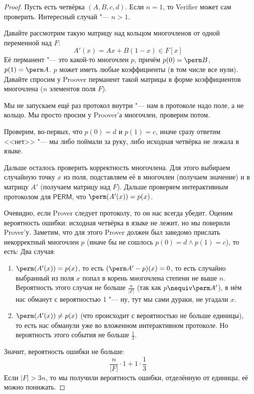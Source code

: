 	\begin{proof}
		Пусть есть четвёрка $(A, B, c, d)$.
		Если $n=1$, то Verifier может сам проверить.
		Интересный случай "--- $n>1$.

		Давайте рассмотрим такую матрицу над кольцом многочленов от одной переменной над $F$:
		\[ A'(x) = Ax + B(1-x) \in F[x] \]
		Её перманент "--- это какой-то многочлен $p$, причём $p(0)=\perm B$, $p(1)=\perm A$.
		$p$ может иметь любые коэффициенты (в том числе все нули).
		Давайте спросим у Proover перманент такой матрицы в форме коэффициентов многочлена ($n$ элементов поля $F$).
		\begin{Rem}
			Мы не запускаем ещё раз протокол внутри "--- нам в протоколе надо поле, а не кольцо.
			Мы просто просим у Proover'а многочлен, проверим потом.
		\end{Rem}
		Проверим, во-первых, что $p(0)=d$ и $p(1)=c$, иначе сразу ответим <<нет>> "--- мы либо поймали за руку, либо исходная четвёрка не лежала в языке.

		Дальше осталось проверить корректность многочлена.
		Для этого выбираем случайную точку $x$ из поля, подставляем её в многочлен (получаем значение) и в матрицу $A'$ (получаем матрицу над $F$).
		Дальше проверяем интерактивным протоколом для $\mathsf{PERM}$, что $\perm (A'(x)) = p(x)$.

		Очевидно, если Prover следует протоколу, то он нас всегда убедит.
		Оценим вероятность ошибки: исходная четвёрка в языке не лежит, но мы поверили Prover'у.
		Заметим, что для этого Prover должен был заведомо прислать некорректный многочлен $p$ (иначе бы не сошлось $p(0)=d \land p(1)=c$),
		то есть:
		Два случая:
		\begin{enumerate}
			\item
				$\perm (A'(x)) = p(x)$, то есть $(\perm A' - p)(x) = 0$, то есть случайно выбранный из поля $x$ попал в корень многочлена степени не выше $n$.
				Вероятность этого случая не больше $\frac{n}{|F|}$ (так как $p \nequiv \perm A'$), в нём нас обманут с вероятностью 1 "--- ну, тут мы сами дураки, не угадали $x$.
			\item
				$\perm (A'(x)) \neq p(x)$ (что происходит с вероятностью не больше единицы), то есть нас обманули уже во вложенном интерактивном протоколе.
				Но вероятность этого события не больше $\frac 13$.
		\end{enumerate}
		Значит, вероятность ошибки не больше:
		\[ \frac{n}{|F|} \cdot 1 + 1 \cdot \frac 13 \]
		Если $|F| > 3n$, то мы получили вероятность ошибки, отделённую от единицы, её можно понижать.
	\end{proof}

